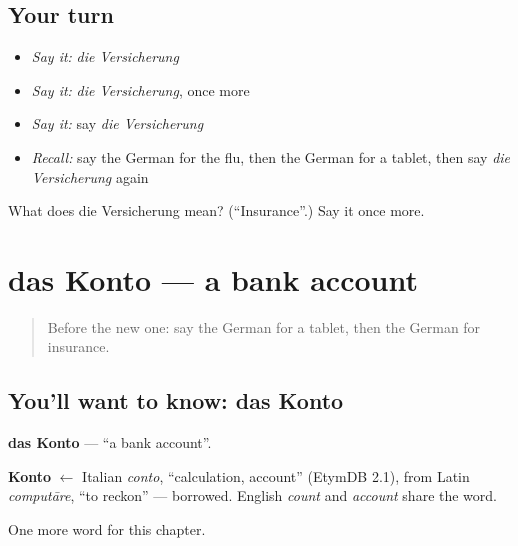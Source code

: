 \subsection*{Your turn}
\begin{itemize}
\raggedright
  \item \emph{Say it:} \emph{die Versicherung}
  \item \emph{Say it:} \emph{die Versicherung}, once more
  \item \emph{Say it:} say \emph{die Versicherung}
  \item \emph{Recall:} say the German for the flu, then the German for a tablet, then say \emph{die Versicherung} again
\end{itemize}

\begin{tcolorbox}[breakable,colback=teal!4,colframe=teal!35!black,title={Before you move on}]
What does die Versicherung mean? (\textquotedblleft{}Insurance\textquotedblright{}.) Say it once more.
\end{tcolorbox}
\section[das Konto]{das Konto — a bank account}

\label{lesson:GE-C157-konto}



\begin{quote}
Before the new one: say the German for a tablet, then the German for insurance.
\end{quote}

\subsection*{You'll want to know: das Konto}
\textbf{das Konto} — \textquotedblleft{}a bank account\textquotedblright{}.

\begin{cousinweb}
\textbf{Konto} $\leftarrow$ Italian \emph{conto}, \textquotedblleft{}calculation, account\textquotedblright{} (EtymDB 2.1), from Latin \emph{computāre}, \textquotedblleft{}to reckon\textquotedblright{} — borrowed. English \emph{count} and \emph{account} share the word.
\end{cousinweb}

\begin{grammarlens}[title={What you've built}]
One more word for this chapter.
\end{grammarlens}

